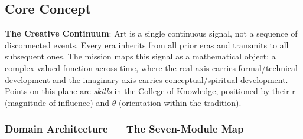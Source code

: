 \documentclass[11pt,letterpaper]{article}
\begin{document}
\subsection{Core Concept}

\textbf{The Creative Continuum}: Art is a single continuous signal, not a sequence of disconnected events. Every era inherits from all prior eras and transmits to all subsequent ones. The mission maps this signal as a mathematical object: a complex-valued function across time, where the real axis carries formal/technical development and the imaginary axis carries conceptual/spiritual development. Points on this plane are \emph{skills} in the College of Knowledge, positioned by their r (magnitude of influence) and $\theta$ (orientation within the tradition).

\subsubsection{Domain Architecture --- The Seven-Module Map}
\end{document}
